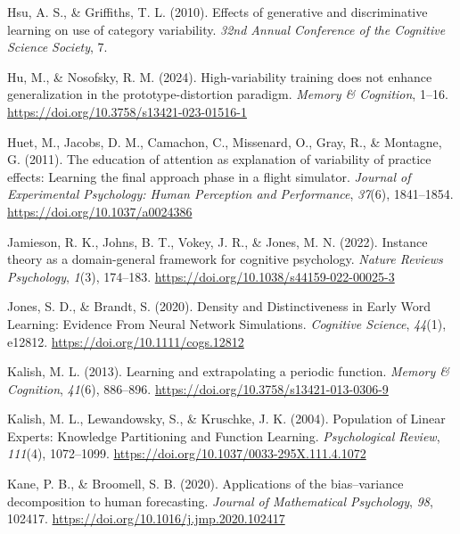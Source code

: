 \documentclass[
  11pt,
  letterpaper,
]{article}
\newlength{\cslhangindent}
\newenvironment{CSLReferences}[2] %
 {\begin{list}{}{%
  \setlength{\itemindent}{0pt}
  \setlength{\leftmargin}{0pt}
  \setlength{\parsep}{0pt}
  \ifodd #1
   \setlength{\leftmargin}{\cslhangindent}
   \setlength{\itemindent}{-1\cslhangindent}
  \fi
  \setlength{\itemsep}{#2\baselineskip}}}
 {\end{list}}
\begin{document}
\begin{CSLReferences}{1}{0}
Hsu, A. S., \& Griffiths, T. L. (2010). Effects of generative and
discriminative learning on use of category variability. \emph{32nd
Annual Conference of the Cognitive Science Society}, 7.

Hu, M., \& Nosofsky, R. M. (2024). High-variability training does not
enhance generalization in the prototype-distortion paradigm.
\emph{Memory \& Cognition}, 1--16.
\url{https://doi.org/10.3758/s13421-023-01516-1}

Huet, M., Jacobs, D. M., Camachon, C., Missenard, O., Gray, R., \&
Montagne, G. (2011). The education of attention as explanation of
variability of practice effects: {Learning} the final approach phase in
a flight simulator. \emph{Journal of Experimental Psychology: Human
Perception and Performance}, \emph{37}(6), 1841--1854.
\url{https://doi.org/10.1037/a0024386}

Jamieson, R. K., Johns, B. T., Vokey, J. R., \& Jones, M. N. (2022).
Instance theory as a domain-general framework for cognitive psychology.
\emph{Nature Reviews Psychology}, \emph{1}(3), 174--183.
\url{https://doi.org/10.1038/s44159-022-00025-3}

Jones, S. D., \& Brandt, S. (2020). Density and {Distinctiveness} in
{Early Word Learning}: {Evidence From Neural Network Simulations}.
\emph{Cognitive Science}, \emph{44}(1), e12812.
\url{https://doi.org/10.1111/cogs.12812}

Kalish, M. L. (2013). Learning and extrapolating a periodic function.
\emph{Memory \& Cognition}, \emph{41}(6), 886--896.
\url{https://doi.org/10.3758/s13421-013-0306-9}

Kalish, M. L., Lewandowsky, S., \& Kruschke, J. K. (2004). Population of
{Linear Experts}: {Knowledge Partitioning} and {Function Learning}.
\emph{Psychological Review}, \emph{111}(4), 1072--1099.
\url{https://doi.org/10.1037/0033-295X.111.4.1072}

Kane, P. B., \& Broomell, S. B. (2020). Applications of the
bias--variance decomposition to human forecasting. \emph{Journal of
Mathematical Psychology}, \emph{98}, 102417.
\url{https://doi.org/10.1016/j.jmp.2020.102417}


\end{CSLReferences}
\end{document}
